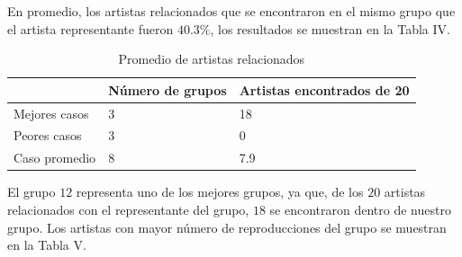 \documentclass[conference]{IEEEtran}
\begin{document}
En promedio, los artistas relacionados que se encontraron en el mismo grupo que el artista representante fueron $40.3 \%$, los resultados se muestran en la Tabla IV.

\begin{table}[]
\centering
\caption{Promedio de artistas relacionados}
\label{tab:artistas_encontrados_count}
\begin{tabular}{|L{1.2cm}|L{2.5cm}|L{2.7cm}|}
\hline
 &  Número de grupos & Artistas encontrados de 20 \\ \hline
Mejores casos & 3 & 18  \\ \hline
Peores casos & 3 & 0 \\ \hline
Caso promedio & 8 & 7.9  \\ \hline
\end{tabular}
\end{table}

El grupo $12$ representa uno de los  mejores grupos, ya que, de los $20$ artistas relacionados con el representante del grupo, $18$ se encontraron dentro de nuestro grupo. 
Los artistas con mayor número de reproducciones del grupo se muestran
en la Tabla V. 
\end{document}
